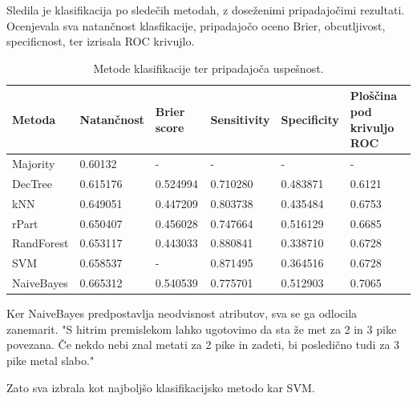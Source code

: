 \documentclass[a4paper,11pt]{article}
\begin{document}
Sledila je klasifikacija po sledečih metodah, z doseženimi pripadajočimi 
rezultati. Ocenjevala sva natančnost klasfikacije, pripadajočo oceno Brier, 
obcutljivost, specificnost, ter izrisala ROC krivujlo.

\begin{table}[H]
\caption{Metode klasifikacije ter pripadajoča uspešnost.}
\label{tab1}
\begin{center}
\begin{tabular}{lllllp{3cm}}
\hline
Metoda & Natančnost & Brier score & Sensitivity & Specificity & Ploščina pod krivuljo ROC\\
\hline
Majority & 0.60132 & - & - & - & - \\
\hline
DecTree & 0.615176 & 0.524994 & 0.710280 & 0.483871 & 0.6121 \\
kNN & 0.649051 & 0.447209 & 0.803738 & 0.435484 & 0.6753 \\
rPart & 0.650407 & 0.456028 & 0.747664 & 0.516129 & 0.6685 \\
RandForest & 0.653117 & 0.443033 & 0.880841 & 0.338710 & 0.6728 \\
SVM & 0.658537 & - & 0.871495 & 0.364516 & 0.6728 \\
NaiveBayes & 0.665312 & 0.540539 & 0.775701 & 0.512903 & 0.7065 \\
\hline
\end{tabular}
\end{center}
\end{table}

Ker NaiveBayes predpostavlja neodvisnost atributov, sva se ga odlocila zanemarit.
"S hitrim premislekom lahko ugotovimo da sta že met za 2 in 3 pike povezana. Če nekdo 
nebi znal metati za 2 pike in zadeti, bi posledično tudi za 3 pike metal slabo."

Zato sva izbrala kot najboljšo klasifikacijsko metodo kar SVM.
\end{document}
